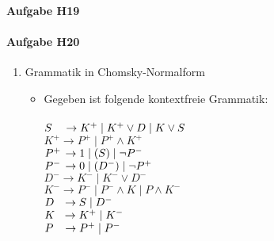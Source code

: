 \documentclass[11pt]{article}
\begin{document}

\paragraph{Aufgabe H19}


\paragraph{Aufgabe H20}
\begin{enumerate}
\item Grammatik in Chomsky-Normalform
\begin{itemize}
\item \hspace*{6mm} Gegeben ist folgende kontextfreie Grammatik:
\\
\\\hspace*{6mm} $S \hspace{3,5mm}\rightarrow K^{+}\mid K^{+}\vee D\mid K\vee S$
\\\hspace*{6mm} $K^{+} \rightarrow P^{+}\mid P^{+}\wedge K^{+}$
\\\hspace*{6mm} $P^{+} \hspace{0,5mm}\rightarrow 1\mid (S)\mid \neg P^{-}$
\\\hspace*{6mm} $P^{-} \hspace{0,5mm}\rightarrow 0\mid (D^{-})\mid \neg P^{+}$
\\\hspace*{6mm} $D^{-} \rightarrow K^{-}\mid K^{-}\vee D^{-}$
\\\hspace*{6mm} $K^{-} \rightarrow P^{-}\mid P^{-}\wedge K\mid P\wedge K^{-}$
\\\hspace*{6mm} $D \hspace{2,5mm}\rightarrow S\mid D^{-}$
\\\hspace*{6mm} $K \hspace{2,2mm}\rightarrow K^{+}\mid K^{-}$
\\\hspace*{6mm} $P \hspace{2,8mm}\rightarrow P^{+}\mid P^{-}$

\end{itemize}
\end{enumerate}
\end{document}
